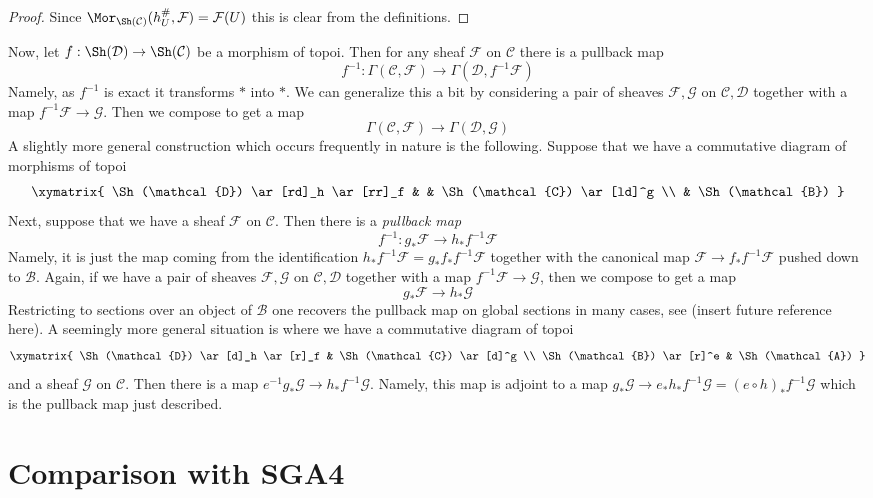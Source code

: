 \begin{proof}
Since $\Mor_{\Sh(\mathcal{C})}(h_U^\#, \mathcal{F}) = \mathcal{F}(U)$
this is clear from the definitions.
\end{proof}

\noindent
Now, let $f : \Sh(\mathcal{D}) \to \Sh(\mathcal{C})$ be a
morphism of topoi. Then for any sheaf $\mathcal{F}$ on $\mathcal{C}$
there is a pullback map
$$
f^{-1} :
\Gamma(\mathcal{C}, \mathcal{F})
\longrightarrow
\Gamma(\mathcal{D}, f^{-1}\mathcal{F})
$$
Namely, as $f^{-1}$ is exact it transforms $*$ into $*$. We can generalize
this a bit by considering a pair of sheaves $\mathcal{F}, \mathcal{G}$
on $\mathcal{C}, \mathcal{D}$ together with a map
$f^{-1}\mathcal{F} \to \mathcal{G}$. Then we compose to get a map
$$
\Gamma(\mathcal{C}, \mathcal{F})
\longrightarrow
\Gamma(\mathcal{D}, \mathcal{G})
$$
A slightly more general construction which occurs frequently in nature
is the following. Suppose that we have a commutative diagram of
morphisms of topoi
$$
\xymatrix{
\Sh(\mathcal{D}) \ar[rd]_h \ar[rr]_f & &
\Sh(\mathcal{C}) \ar[ld]^g \\
& \Sh(\mathcal{B})
}
$$
Next, suppose that we have a sheaf $\mathcal{F}$ on $\mathcal{C}$.
Then there is a {\it pullback map}
$$
f^{-1} : g_*\mathcal{F} \longrightarrow h_*f^{-1}\mathcal{F}
$$
Namely, it is just the map coming from the identification
$h_*f^{-1}\mathcal{F} = g_*f_*f^{-1}\mathcal{F}$ together with the canonical
map $\mathcal{F} \to f_*f^{-1}\mathcal{F}$ pushed down to $\mathcal{B}$.
Again, if we have a pair of sheaves $\mathcal{F}, \mathcal{G}$
on $\mathcal{C}, \mathcal{D}$ together with a map
$f^{-1}\mathcal{F} \to \mathcal{G}$, then we compose to get a map
$$
g_*\mathcal{F} \longrightarrow h_*\mathcal{G}
$$
Restricting to sections over an object of $\mathcal{B}$ one recovers
the pullback map on global sections in many cases, see
(insert future reference here). A seemingly more general situation is
where we have a commutative diagram of topoi
$$
\xymatrix{
\Sh(\mathcal{D}) \ar[d]_h \ar[r]_f &
\Sh(\mathcal{C}) \ar[d]^g \\
\Sh(\mathcal{B}) \ar[r]^e & \Sh(\mathcal{A})
}
$$
and a sheaf $\mathcal{G}$ on $\mathcal{C}$. Then there is a map
$e^{-1}g_*\mathcal{G} \to h_*f^{-1}\mathcal{G}$. Namely, this map
is adjoint to a map
$g_*\mathcal{G} \to e_*h_*f^{-1}\mathcal{G} = (e \circ h)_*f^{-1}\mathcal{G}$
which is the pullback map just described.






\section{Comparison with SGA4}
\label{section-notation-comparison}

